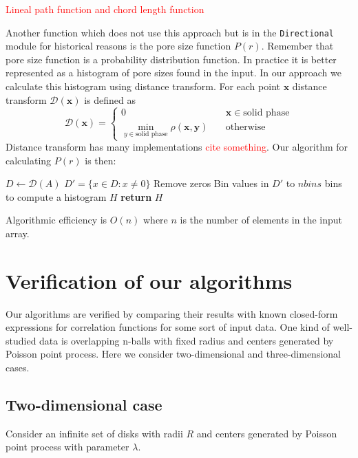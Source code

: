 \documentclass[reprint,amsmath,amssymb,aps,pre,showkeys,showpacs,nofootinbib]{revtex4-1}
\newcommand{\code}[1]{\colorbox{light-gray}{\texttt{#1}}}
\begin{document}
\textcolor{red}{Lineal path function and chord length function}

Another function which does not use this approach but is in the
\code{Directional} module for historical reasons is the pore size function
$P(r)$. Remember that pore size function is a probability distribution
function. In practice it is better represented as a histogram of pore sizes
found in the input. In our approach we calculate this histogram using distance
transform. For each point $\bm{x}$ distance transform $\mathcal{D}(\bm{x})$ is
defined as
\begin{equation*}
  \mathcal{D}(\bm{x})= \left\{
  \begin{array}{ll}
    0 & \quad \bm{x} \in \text{solid phase} \\
    \min\limits_{y \in \text{solid phase}} \rho(\bm{x},\bm{y}) & \quad \text{otherwise}
  \end{array}
\right.
\end{equation*}
Distance transform has many implementations \textcolor{red}{cite something}. Our
algorithm for calculating $P(r)$ is then:
\begin{algorithmic}[1]
    \State $D \gets \mathcal{D}(A)$ 
    \State $D' = \{ x \in D: x \ne 0\}$
    \Comment Remove zeros
    \State Bin values in $D'$ to $nbins$ bins to compute a histogram $H$
    \State \textbf{return} $H$
  \EndProcedure
\end{algorithmic}
Algorithmic efficiency is $O(n)$ where $n$ is the number of elements in the
input array.

\section{Verification of our algorithms}
\label{sec:verification}
Our algorithms are verified by comparing their results with known closed-form
expressions for correlation functions for some sort of input data. One kind of
well-studied data is overlapping n-balls with fixed radius and centers generated
by Poisson point process. Here we consider two-dimensional and three-dimensional
cases.

\subsection{Two-dimensional case}
Consider an infinite set of disks with radii $R$ and centers generated by
Poisson point process with parameter $\lambda$.
\end{document}
